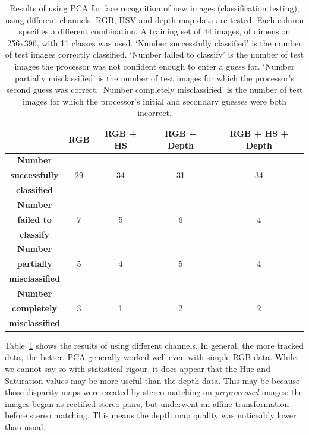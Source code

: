 \begin{table}[h!]
  \centering
  \begin{tabular}{c c c c c}
    \toprule
    \textbf{ } & \textbf{ RGB } & \textbf{ RGB + HS } & \textbf{RGB + Depth} & \textbf{RGB + HS + Depth}\\
    \midrule
    \textbf{Number} & {} & {} & {} & {} \\
    \textbf{successfully} & 29 & 34 & 31 & 34\\
    \textbf{classified} & {} & {} & {} & {} \\
    \midrule
    \textbf{Number} & {} & {} & {} & {} \\
    \textbf{failed to} & 7 & 5 & 6 & 4\\
    \textbf{classify} & {} & {} & {} & {} \\
    \midrule
    \textbf{Number} & {} & {} & {} & {} \\
    \textbf{partially} & 5 & 4 & 5 & 4\\
    \textbf{misclassified} & {} & {} & {} & {} \\
    \midrule
    \textbf{Number} & {} & {} & {} & {} \\
    \textbf{completely} & 3 & 1 & 2 & 2\\
    \textbf{misclassified} & {} & {} & {} & {} \\
    \bottomrule
  \end{tabular}
  \caption[Results of classification testing for different numbers of channels]{Results of using PCA for face recognition of new images (classification testing), using different channels. RGB, HSV and depth map data are tested. Each column specifies a different combination. A training set of 44 images, of dimension 256x396, with 11 classes was used. `Number successfully classified' is the number of test images correctly classified. `Number failed to classify' is the number of test images the processor was not confident enough to enter a guess for. `Number partially misclassified' is the number of test images for which the processor's second guess was correct. `Number completely misclassified' is the number of test images for which the processor's initial and secondary guesses were both incorrect.}
  \label{tbl:face-rec-4}
\end{table}

Table~\ref{tbl:face-rec-4} shows the results of using different channels. In general, the more tracked data, the better. PCA generally worked well even with simple RGB data. While we cannot say so with statistical rigour, it does appear that the Hue and Saturation values may be more useful than the depth data. This may be because those disparity maps were created by stereo matching on \emph{preprocessed} images: the images began as rectified stereo pairs, but underwent an affine transformation before stereo matching. This means the depth map quality was noticeably lower than usual.

